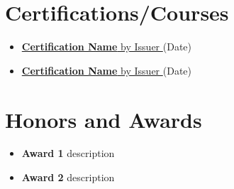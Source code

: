 \documentclass[a4paper,11pt]{article}
\newcommand{\resumeItem}[1]{\item\small{{#1 \vspace{-2pt}}}}
\newcommand{\resumeItemListStart}{\begin{itemize}}
\newcommand{\resumeItemListEnd}{\end{itemize}\vspace{-5pt}}
\begin{document}
\vspace{-3pt}
    \section{Certifications/Courses}
        \resumeItemListStart[parsep = 0pt]
            \resumeItem{\href{https://linktocertification}{\textbf{Certification Name} by Issuer \faExternalLink*} (Date)}
            \resumeItem{\href{https://linktocertification}{\textbf{Certification Name} by Issuer \faExternalLink*} (Date)}
        \resumeItemListEnd

\vspace{-11pt}
\section{Honors and Awards}
    \resumeItemListStart[parsep = -2pt]
        \resumeItem{\textbf{Award 1} description}
        \resumeItem{\textbf{Award 2} description}
    \resumeItemListEnd

\end{document}
